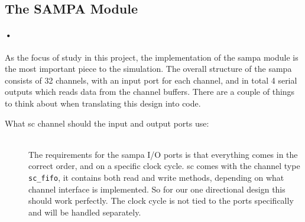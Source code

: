 \documentclass[a4paper, 12pt]{report}
\newcommand{\codeword}[1]{\texttt{#1}}
\begin{document}
\subsection{The SAMPA Module}

\paragraph{•}
As the focus of study in this project, the implementation of the \gls{sampa} module is the most important piece to the simulation.
The overall structure of the \gls{sampa} consists of 32 channels, with an input port for each channel, and in total 4 serial outputs which reads data from the channel buffers.
There are a couple of things to think about when translating this design into code.

\begin{description}
	\item[What \gls{sc} channel should the input and output ports use:] \hfill \\
	 The requirements for the \gls{sampa} I/O ports is that everything comes in the correct order, and on a specific clock cycle.
		\gls{sc} comes with the channel type \codeword{sc\_fifo}, it contains both read and write methods, depending on what channel interface is implemented.
		So for our one directional design this should work perfectly.
		The clock cycle is not tied to the ports specifically and will be handled separately.	
		

\end{description}
\end{document}
